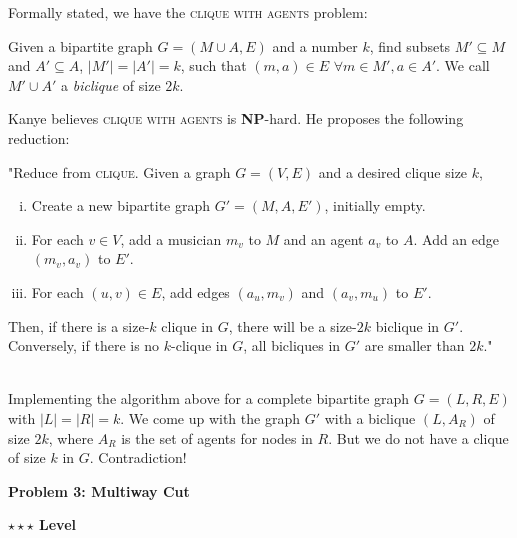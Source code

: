 \documentclass{article}\usepackage[utf8]{inputenc}\usepackage[margin=0.4cm,top=0.4cm,bottom=0.4cm]{geometry}\usepackage[usenames,dvipsnames,svgnames,table]{xcolor}
\begin{document}
\begin{enumerate}[a.]
Formally stated, we have the \textsc{clique with agents} problem:

\begin{addmargin}[0.75cm]{0cm}
Given a bipartite graph $G = (M \cup A,E)$ and a number $k$, find subsets $M' \subseteq M$ and $A' \subseteq A$,
$|M'| = |A'| = k$, such that $(m,a) \in E$ $\forall m \in M',a \in A'$. We call $M' \cup A'$ a \textit{biclique} of size $2k$.
\end{addmargin}

Kanye believes \textsc{clique with agents} is \textbf{NP}-hard. He proposes the following reduction:

\begin{addmargin}[0.75cm]{0cm}
"Reduce from \textsc{clique}. Given a graph $G = (V,E)$ and a desired clique size $k$,
\begin{enumerate}[(i)]
\item Create a new bipartite graph $G' = (M,A,E')$, initially empty.
\item For each $v \in V$, add a musician $m_v$ to $M$ and an agent $a_v$ to $A$. Add an edge $(m_v,a_v)$ to $E'$.
\item For each $(u, v) \in E$, add edges $(a_u,m_v)$ and $(a_v,m_u)$ to $E'$.
\end{enumerate}

Then, if there is a size-$k$ clique in $G$, there will be a size-$2k$ biclique in $G'$. Conversely, if there is no $k$-clique in $G$, all bicliques in $G'$ are smaller than $2k$."
\end{addmargin}
\BeginSolution %
\\
Implementing the algorithm above for a complete bipartite graph $G = (L,R,E)$ with $|L| = |R| = k$. We come up with the graph $G'$ with a biclique $(L,A_R)$ of size $2k$, where $A_R$ is the set of agents for nodes in $R$. But we do not have a clique of size $k$ in $G$. Contradiction!
\EndSolution
\end{enumerate}
\clearpage

\vspace{-2mm}\noindent\begin{mybox}{\begin{center}\textbf{\color{black}Problem 3: Multiway Cut}\end{center}}\end{mybox}\vspace{-2mm}
\begin{myboxot}\noindent\textbf{$\star\star\star$ Level}\end{myboxot} 
\end{document}
